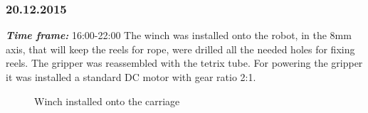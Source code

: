 \subsubsection{20.12.2015}
\textit{\textbf{Time frame:}} 16:00-22:00 \newline
The winch was installed onto the robot, in the 8mm axis, that will keep the reels for rope, were drilled all the needed holes for fixing reels.
The gripper was reassembled with the tetrix tube. For powering the gripper it was installed a standard DC motor with gear ratio 2:1.

\begin{figure}[H]
	\begin{minipage}[h]{0.58\linewidth}
		\caption{Winch installed onto the carriage}
	\end{minipage}
	\hfill
	\begin{minipage}[h]{0.37\linewidth}

\end{minipage}
\end{figure}
